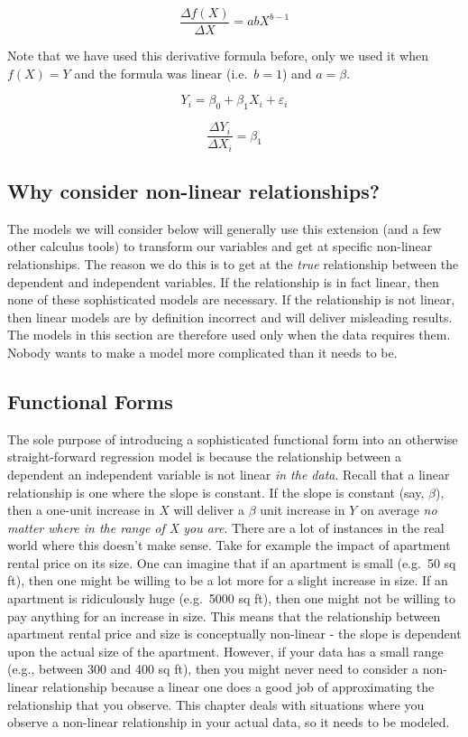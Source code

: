 \documentclass[
]{book}
\begin{document}
\[\frac{\Delta f(X)}{\Delta X}=abX^{b-1}\]

Note that we have used this derivative formula before, only we used it when \(f(X)=Y\) and the formula was linear (i.e.~\(b=1\)) and \(a = \beta\).

\[Y_i = \beta_0 + \beta_1 X_i + \varepsilon_i\]

\[\frac{\Delta Y_i}{\Delta X_i}=\beta_1\]

\hypertarget{why-consider-non-linear-relationships}{%
\subsection{Why consider non-linear relationships?}\label{why-consider-non-linear-relationships}}

The models we will consider below will generally use this extension (and a few other calculus tools) to transform our variables and get at specific non-linear relationships. The reason we do this is to get at the \emph{true} relationship between the dependent and independent variables. If the relationship is in fact linear, then none of these sophisticated models are necessary. If the relationship is not linear, then linear models are by definition incorrect and will deliver misleading results. The models in this section are therefore used only when the data requires them. Nobody wants to make a model more complicated than it needs to be.

\hypertarget{functional-forms}{%
\subsection{Functional Forms}\label{functional-forms}}

The sole purpose of introducing a sophisticated functional form into an otherwise straight-forward regression model is because the relationship between a dependent an independent variable is not linear \emph{in the data}. Recall that a linear relationship is one where the slope is constant. If the slope is constant (say, \(\beta\)), then a one-unit increase in \(X\) will deliver a \(\beta\) unit increase in \(Y\) on average \emph{no matter where in the range of X you are}. There are a lot of instances in the real world where this doesn't make sense. Take for example the impact of apartment rental price on its size. One can imagine that if an apartment is small (e.g.~50 sq ft), then one might be willing to be a lot more for a slight increase in size. If an apartment is ridiculously huge (e.g.~5000 sq ft), then one might not be willing to pay anything for an increase in size. This means that the relationship between apartment rental price and size is conceptually non-linear - the slope is dependent upon the actual size of the apartment. However, if your data has a small range (e.g., between 300 and 400 sq ft), then you might never need to consider a non-linear relationship because a linear one does a good job of approximating the relationship that you observe. This chapter deals with situations where you observe a non-linear relationship in your actual data, so it needs to be modeled.
\end{document}
